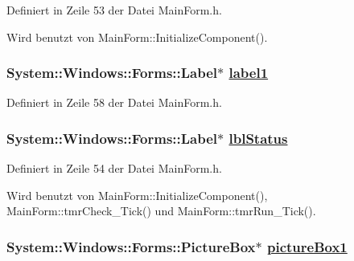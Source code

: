 Definiert in Zeile 53 der Datei Main\-Form.h.

Wird benutzt von Main\-Form::Initialize\-Component().\hypertarget{classQbeNDI_1_1MainForm_QbeNDI_1_1MainFormr5}{
\subsubsection[label1]{\setlength{\rightskip}{0pt plus 5cm}System::Windows::Forms::Label$\ast$ \hyperlink{classQbeNDI_1_1MainForm_QbeNDI_1_1MainFormr5}{label1}}}
\label{classQbeNDI_1_1MainForm_QbeNDI_1_1MainFormr5}




Definiert in Zeile 58 der Datei Main\-Form.h.\hypertarget{classQbeNDI_1_1MainForm_QbeNDI_1_1MainFormr1}{
\subsubsection[lblStatus]{\setlength{\rightskip}{0pt plus 5cm}System::Windows::Forms::Label$\ast$ \hyperlink{classQbeNDI_1_1MainForm_QbeNDI_1_1MainFormr1}{lbl\-Status}}}
\label{classQbeNDI_1_1MainForm_QbeNDI_1_1MainFormr1}




Definiert in Zeile 54 der Datei Main\-Form.h.

Wird benutzt von Main\-Form::Initialize\-Component(), Main\-Form::tmr\-Check\_\-Tick() und Main\-Form::tmr\-Run\_\-Tick().\hypertarget{classQbeNDI_1_1MainForm_QbeNDI_1_1MainFormr4}{
\subsubsection[pictureBox1]{\setlength{\rightskip}{0pt plus 5cm}System::Windows::Forms::Picture\-Box$\ast$ \hyperlink{classQbeNDI_1_1MainForm_QbeNDI_1_1MainFormr4}{picture\-Box1}}}
\label{classQbeNDI_1_1MainForm_QbeNDI_1_1MainFormr4}




